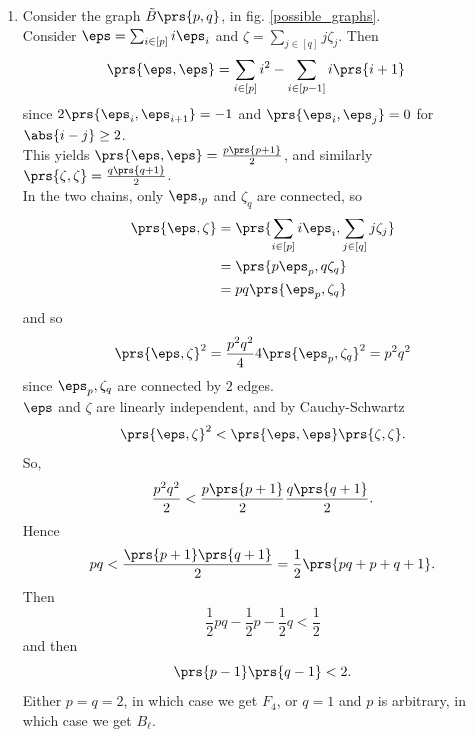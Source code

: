 \documentclass[10pt,a4paper,twoside,openany,hidelinks]{book}
\begin{document}
\begin{enumerate}
$G_2$ is the only connected with with a triple edge. See fig. \ref{possible_graphs}.
\begin{proof}
\begin{enumerate}[label = \Roman*)]
\item A double edge can appear only once. Otherwise we get the forbidden graph (i).
\item A tripod cannot appear together with a double edge, since this will give forbidden graph (ii).
\item A tripod can appear only once, since otherwise we get forbidden graph (iii).
\end{enumerate}
\end{proof}

\item Consider the graph $\tilde{B}\prs{p,q}$, in fig. \ref{possible_graphs}.
\\
Consider $\eps = \sum_{i \in [p]} i \eps _i$ and $\zeta = \sum_{j\in[q]} j \zeta_j$. Then
\begin{align*}
\prs{\eps, \eps} &= \sum_{i \in [p]} i^2 - \sum_{i\in[p-1]} i\prs{i+1}
\end{align*}
since $2 \prs{\eps_i, \eps_{i+1}} = -1$ and $\prs{\eps_i, \eps_j} = 0$ for $\abs{i-j} \geq 2$.\\
This yields $\prs{\eps,\eps} = \frac{p\prs{p+1}}{2}$, and similarly $\prs{\zeta, \zeta} = \frac{q\prs{q+1}}{2}$.\\
In the two chains, only $\eps,_p$ and $\zeta_q$ are connected, so
\begin{align*}
\prs{\eps, \zeta} &= 
\prs{\sum_{i \in [p]} i \eps_i, \sum_{j \in [q]} j \zeta_j} \\&=
\prs{p \eps_p, q\zeta_q} \\&=
pq \prs{\eps_p, \zeta_q}
\end{align*}
and so
\[\prs{\eps,\zeta}^2 = \frac{p^2 q^2}{4} 4\prs{\eps_p, \zeta_q}^2 = p^2 q^2\]
since $\eps_p,\zeta_q$ are connected by $2$ edges.\\
$\eps$ and $\zeta$ are linearly independent, and by Cauchy-Schwartz
\[\prs{\eps,\zeta}^2 < \prs{\eps,\eps} \prs{\zeta,\zeta} \text{.}\]
So,
\[\frac{p^2 q^2}{2} < \frac{p\prs{p+1}}{2} \frac{q\prs{q+1}}{2} \text{.}\]
Hence
\[pq < \frac{\prs{p+1}\prs{q+1}}{2} = \frac{1}{2}\prs{pq + p+q+1} \text{.}\]
Then
\[\frac{1}{2} pq - \frac{1}{2} p - \frac{1}{2} q < \frac{1}{2}\]
and then
\[\prs{p-1}\prs{q-1} < 2 \text{.}\]
Either $p=q=2$, in which case we get $F_4$, or $q=1$ and $p$ is arbitrary, in which case we get $B_{\ell}$.


\end{enumerate}
\end{document}
